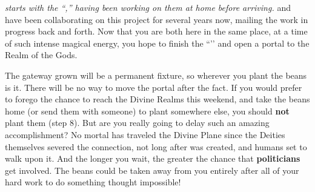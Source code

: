 \documentclass[green]{GL2020}
\begin{document}
\name{\gMagicBeans{}}

\emph{\cCurse{} starts with the ``\iBeansNB{},'' having been working on them at home before arriving.} \cFlowPriest{\full} and \cCurse{\full} have been collaborating on this project for several years now, mailing the work in progress back and forth. Now that you are both here in the same place, at a time of such intense magical energy, you hope to finish the ``\iBeansNB{}’’ and open a portal to the Realm of the Gods.

The gateway grown will be a permanent fixture, so wherever you plant the beans is it. There will be no way to move the portal after the fact. If you would prefer to forego the chance to reach the Divine Realms this weekend, and take the beans home (or send them with someone) to plant somewhere else, you should \textbf{not} plant them (step 8). But are you really going to delay such an amazing accomplishment? No mortal has traveled the Divine Plane since the Deities themselves severed the connection, not long after \pEarth{} was created, and humans set to walk upon it. And the longer you wait, the greater the chance that \textbf{politicians} get involved. The beans could be taken away from you entirely after all of your hard work to do something thought impossible! 
\end{document}

